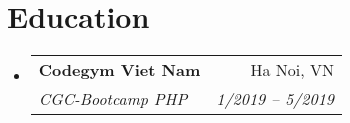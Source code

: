 \documentclass[letterpaper,11pt]{article}
\makeatletter
\newcommand{\resumeSubheading}[4]{
  \vspace{-1pt}\item
    \begin{tabular*}{0.97\textwidth}[t]{l@{\extracolsep{\fill}}r}
      \textbf{#1} & #2 \\
      \textit{\small#3} & \textit{\small #4} \\
    \end{tabular*}\vspace{-5pt}
}
\newcommand{\resumeSubHeadingListStart}{\begin{itemize}[leftmargin=*]}
\newcommand{\resumeSubHeadingListEnd}{\end{itemize}}
\makeatother
\begin{document}


\section{Education}
  \resumeSubHeadingListStart
    \resumeSubheading
      {Codegym Viet Nam}{Ha Noi, VN}
      {CGC-Bootcamp PHP}{1/2019 -- 5/2019}
  \resumeSubHeadingListEnd

\end{document}
